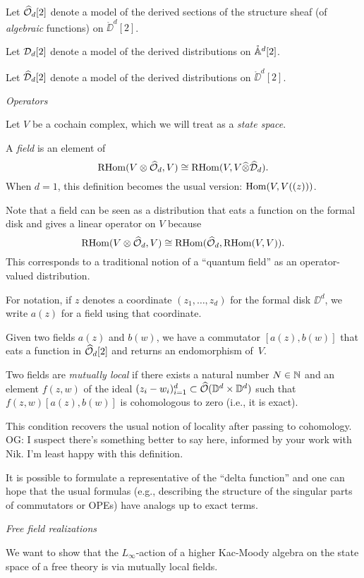 \documentclass[11pt]{amsart}
\def\RHom{{\rm RHom}}
\def\owen#1{{\textcolor{violet!65!black}{OG: {#1}}}}
\begin{document}
Let $\widehat{\cO}_d{[2]}$ denote a model of the derived sections of the structure sheaf (of {\em algebraic} functions) on $\mathring{\DD}^d[2]$.

Let $\cD_d[2]$ denote a model of the derived distributions on $\mathring{\AA}^d[2]$.

Let $\widehat{\cD}_d[2]$ denote a model of the derived distributions on $\mathring{\DD}^d[2]$.
\newpage

{\it Operators}

Let $V$ be a cochain complex, which we will treat as a {\em state space}.

A {\em field} is an element of 
\[
\RHom(V \otimes \widehat{\cO}_d, V) \cong \RHom(V, V \widehat{\otimes} \widehat{\cD}_d).
\]
When $d=1$, this definition becomes the usual version: $\Hom(V, V((z)))$.

Note that a field can be seen as a distribution that eats a function on the formal disk and gives a linear operator on $V$ because
\[
\RHom(V \otimes \widehat{\cO}_d, V) \cong \RHom(\widehat{\cO}_d, \RHom(V,V)).
\]
This corresponds to a traditional notion of a ``quantum field'' as an operator-valued distribution.

For notation, if $z$ denotes a coordinate $(z_1,\ldots,z_d)$ for the formal disk $\DD^d$,
we write $a(z)$ for a field using that coordinate.

Given two fields $a(z)$ and $b(w)$, we have a commutator $[a(z),b(w)]$ that eats a function in $\widehat{\cO}_d[2]$ and returns an endomorphism of~$V$.

Two fields are {\em mutually local} if there exists a natural number $N \in \NN$ and an element $f(z,w)$ of the ideal $(z_i-w_i)_{i =1}^d \subset \widehat{\cO}(\DD^d\times \DD^d)$ such that $f(z,w)[a(z),b(w)]$ is cohomologous to zero (i.e., it is exact).

This condition recovers the usual notion of locality after passing to cohomology. 
\owen{I suspect there's something better to say here, informed by your work with Nik. I'm least happy with this definition.}

It is possible to formulate a representative of the ``delta function'' and one can hope that the usual formulas (e.g., describing the structure of the singular parts of commutators or OPEs) have analogs up to exact terms.

{\it Free field realizations}

We want to show that the $L_\infty$-action of a higher Kac-Moody algebra on the state space of a free theory is via mutually local fields.
\end{document}
